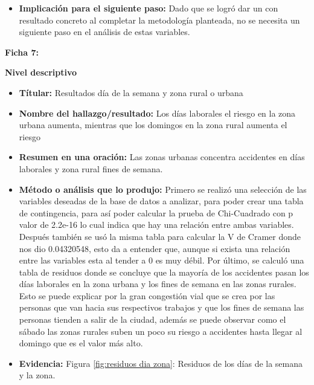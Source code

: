 \documentclass[12pt]{article}
\begin{document}
\begin{itemize}
   \item \textbf{Implicación para el siguiente paso:} Dado que se logró dar un con 
  resultado concreto al completar la metodología planteada, no se necesita un 
  siguiente paso en el análisis de estas variables. \\
	
	
\end{itemize} 
 
\textbf{Ficha 7:}

\textbf{Nivel descriptivo}
\begin{itemize}
    \item \textbf{Títular:} Resultados día de la semana y zona rural o urbana
    
    \item \textbf{Nombre del hallazgo/resultado:}  Los días laborales el riesgo en la zona urbana aumenta,
    mientras que los domingos en la zona rural aumenta el riesgo
    
    \item \textbf{Resumen en una oración:} Las zonas urbanas concentra accidentes en días laborales y zona rural fines de semana. 
    
    \item \textbf{Método o análisis que lo produjo:} Primero se realizó una selección de las variables 
    deseadas de la base de datos a analizar, para poder crear una tabla de contingencia, para así poder 
    calcular la prueba de Chi-Cuadrado con p valor de 2.2e-16 lo cual indica que hay una relación entre ambas 
    variables. Después también se usó la misma tabla para calcular la V de Cramer donde nos dio 0.04320548, esto 
    da a entender que, aunque si exista una relación entre las variables esta al tender a 0 es muy débil. Por último, 
    se calculó una tabla de residuos donde se concluye que la mayoría de los accidentes pasan los días laborales en la 
    zona urbana y los fines de semana en las zonas rurales. Esto se puede explicar por la gran congestión vial que se crea 
    por las personas que van hacia sus respectivos trabajos y que los fines de semana las personas tienden a salir de la ciudad, 
    además se puede observar como el sábado las zonas rurales suben un poco su riesgo a accidentes hasta llegar al domingo que es el valor más alto.
    
    \item \textbf{Evidencia:} Figura \ref{fig:residuos dia zona}: Residuos de los días de la 
    semana y la zona.\\

\end{itemize}
\end{document}
